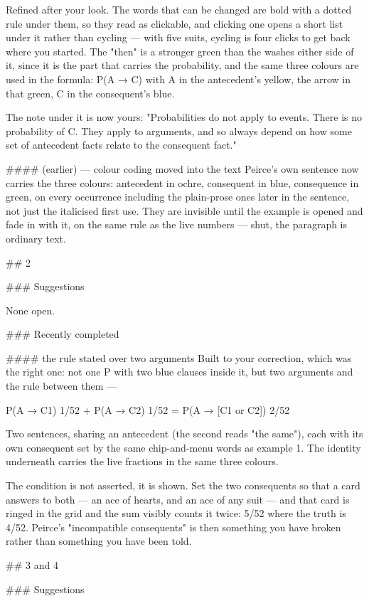 Refined after your look. The words that can be changed are bold with a dotted
rule under them, so they read as clickable, and clicking one opens a short list
under it rather than cycling — with five suits, cycling is four clicks to get
back where you started. The "then" is a stronger green than the washes either
side of it, since it is the part that carries the probability, and the same
three colours are used in the formula: P(A → C) with A in the antecedent's
yellow, the arrow in that green, C in the consequent's blue.

The note under it is now yours: "Probabilities do not apply to events. There is
no probability of C. They apply to arguments, and so always depend on how some
set of antecedent facts relate to the consequent fact."

#### (earlier) — colour coding moved into the text
Peirce's own sentence now carries the three colours: antecedent in ochre,
consequent in blue, consequence in green, on every occurrence including the
plain-prose ones later in the sentence, not just the italicised first use. They
are invisible until the example is opened and fade in with it, on the same rule
as the live numbers — shut, the paragraph is ordinary text.


## 2

### Suggestions

None open.

### Recently completed

#### the rule stated over two arguments
Built to your correction, which was the right one: not one P with two blue
clauses inside it, but two arguments and the rule between them —

  P(A → C1)  1/52  +  P(A → C2)  1/52  =  P(A → [C1 or C2])  2/52

Two sentences, sharing an antecedent (the second reads "the same"), each with
its own consequent set by the same chip-and-menu words as example 1. The
identity underneath carries the live fractions in the same three colours.

The condition is not asserted, it is shown. Set the two consequents so that a
card answers to both — an ace of hearts, and an ace of any suit — and that card
is ringed in the grid and the sum visibly counts it twice: 5/52 where the truth
is 4/52. Peirce's "incompatible consequents" is then something you have broken
rather than something you have been told.


## 3 and 4

### Suggestions

